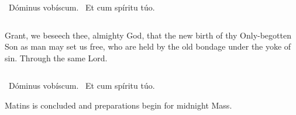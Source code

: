 {{  }

  {
    \medskip
  }

  \Vbar{}~Dóminus vobíscum. \Rbar{}~Et cum spíritu túo.
  \bigskip

  {


  }
  \smallskip

  {
    \begin{columns}
           {Grant, we beseech thee, almighty God, that the new birth of thy Only-begotten Son as man may set us free, who are held by the old bondage under the yoke of sin. Through the same Lord.}
    \end{columns}
  }
  \bigskip{}

  \Vbar{}~Dóminus vobíscum. \Rbar{}~Et cum spíritu túo.

  \bigskip{}
  {
    \def\annot{\small{5.}}
    \large

    \bigskip{}

    \noindent{}Matins is concluded and preparations begin for midnight Mass.
  }
}